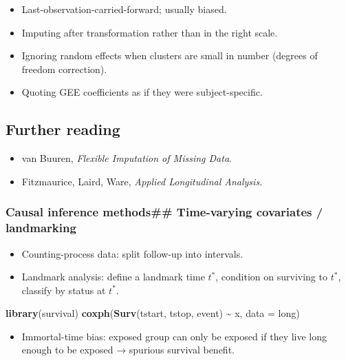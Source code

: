 \documentclass[
]{article}
\newenvironment{Shaded}{\begin{snugshade}}{\end{snugshade}}
\newcommand{\AttributeTok}[1]{\textcolor[rgb]{0.13,0.29,0.53}{#1}}
\newcommand{\FunctionTok}[1]{\textcolor[rgb]{0.13,0.29,0.53}{\textbf{#1}}}
\newcommand{\NormalTok}[1]{#1}
\newcommand{\SpecialCharTok}[1]{\textcolor[rgb]{0.81,0.36,0.00}{\textbf{#1}}}
\providecommand{\tightlist}{%
  \setlength{\itemsep}{0pt}\setlength{\parskip}{0pt}}
\begin{document}
\begin{itemize}
\tightlist
\item
  Last-observation-carried-forward; usually biased.
\item
  Imputing after transformation rather than in the right scale.
\item
  Ignoring random effects when clusters are small in number (degrees of
  freedom correction).
\item
  Quoting GEE coefficients as if they were subject-specific.
\end{itemize}

\subsection{Further reading}\label{further-reading-9}

\begin{itemize}
\tightlist
\item
  van Buuren, \emph{Flexible Imputation of Missing Data}.
\item
  Fitzmaurice, Laird, Ware, \emph{Applied Longitudinal Analysis}.
\end{itemize}

\subsubsection{Causal inference methods\#\# Time-varying covariates /
landmarking}\label{causal-inference-methods-time-varying-covariates-landmarking}

\begin{itemize}
\tightlist
\item
  Counting-process data: split follow-up into intervals.
\item
  Landmark analysis: define a landmark time \(t^*\), condition on
  surviving to \(t^*\), classify by status at \(t^*\).
\end{itemize}

\begin{Shaded}
\begin{Highlighting}[]
\FunctionTok{library}\NormalTok{(survival)}
\FunctionTok{coxph}\NormalTok{(}\FunctionTok{Surv}\NormalTok{(tstart, tstop, event) }\SpecialCharTok{\textasciitilde{}}\NormalTok{ x, }\AttributeTok{data =}\NormalTok{ long)}
\end{Highlighting}
\end{Shaded}

\begin{itemize}
\tightlist
\item
  Immortal-time bias: exposed group can only be exposed if they live
  long enough to be exposed → spurious survival benefit.
\end{itemize}
\end{document}

